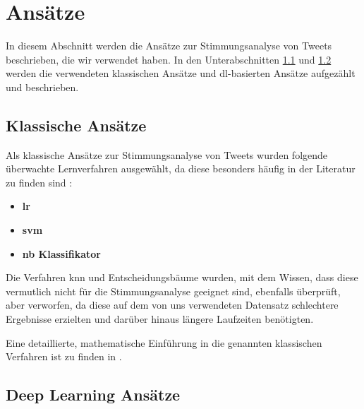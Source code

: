 \section{Ansätze}

In diesem Abschnitt werden die Ansätze zur Stimmungsanalyse von Tweets beschrieben, die wir verwendet haben.
In den Unterabschnitten \ref{subsec:klassische-ansaetze} und \ref{subsec:deep-learning-ansaetze} werden die verwendeten klassischen Ansätze und \gls{dl}-basierten Ansätze aufgezählt und beschrieben.

\subsection{Klassische Ansätze}\label{subsec:klassische-ansaetze}

Als klassische Ansätze zur Stimmungsanalyse von Tweets wurden folgende überwachte Lernverfahren ausgewählt, da diese besonders häufig in der Literatur zu finden sind \cite{medhat2014sentiment, wankhade2022survey, zimbra2018state}:

\begin{itemize}
    \item \textbf{\gls{lr}}  \hspace{\fill}
    \item \textbf{\gls{svm}} \hspace{\fill}
    \item \textbf{\gls{nb} Klassifikator} \hspace{\fill}
\end{itemize}

Die Verfahren \gls{knn} und Entscheidungsbäume wurden, mit dem Wissen, dass diese vermutlich nicht für die Stimmungsanalyse geeignet sind, ebenfalls überprüft, aber verworfen, da diese auf dem von uns verwendeten Datensatz schlechtere Ergebnisse erzielten und darüber hinaus längere Laufzeiten benötigten.

Eine detaillierte, mathematische Einführung in die genannten klassischen Verfahren ist zu finden in \cite[vgl. die Kapitel 4.4 für \gls{lr}, 4.5 und 12 für \gls{svm}, 6.6.3 für den \gls{nb}-Klassifikator, 13.3 für \gls{knn} und 9.2 für Entscheidungsbäume]{hastie2009elements}.

\subsection{Deep Learning Ansätze}\label{subsec:deep-learning-ansaetze}

